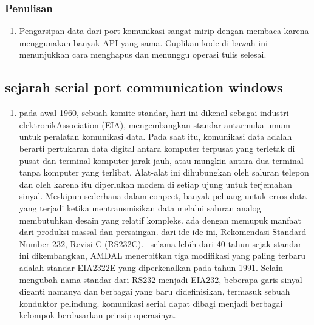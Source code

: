 			\subsubsection{Penulisan}
				\begin{enumerate}
					\item Pengarsipan data dari port komunikasi sangat mirip dengan membaca karena menggunakan banyak API yang sama. Cuplikan kode di bawah ini menunjukkan cara menghapus dan menunggu operasi tulis selesai.
				\end{enumerate}
				
			\subsection{sejarah serial port communication windows}
			\begin{enumerate}
			\item pada awal 1960, sebuah komite standar, hari ini dikenal sebagai industri elektronikAssociation (EIA), mengembangkan standar antarmuka umum untuk peralatan komunikasi data. Pada saat itu, komunikasi data adalah berarti pertukaran data digital antara komputer terpusat yang terletak di pusat dan terminal komputer jarak jauh, atau mungkin antara dua terminal tanpa komputer yang terlibat. Alat-alat ini dihubungkan oleh saluran telepon dan oleh karena itu diperlukan modem di setiap ujung untuk terjemahan sinyal. Meskipun sederhana dalam conpect, banyak peluang untuk erros data yang terjadi ketika mentransmisikan data melalui saluran analog membutuhkan desain yang relatif kompleks. ada dengan memupuk manfaat dari produksi massal dan persaingan. dari ide-ide ini, Rekomendasi Standard Number 232, Revisi C (RS232C).
 selama lebih dari 40 tahun sejak standar ini dikembangkan, AMDAL menerbitkan tiga modifikasi yang paling terbaru adalah standar EIA2322E yang diperkenalkan pada tahun 1991. Selain mengubah nama standar dari RS232 menjadi EIA232, beberapa garis sinyal diganti namanya dan berbagai yang baru didefinisikan, termasuk sebuah konduktor pelindung.
komunikasi serial dapat dibagi menjadi berbagai kelompok berdasarkan prinsip operasinya.
\end{enumerate}


